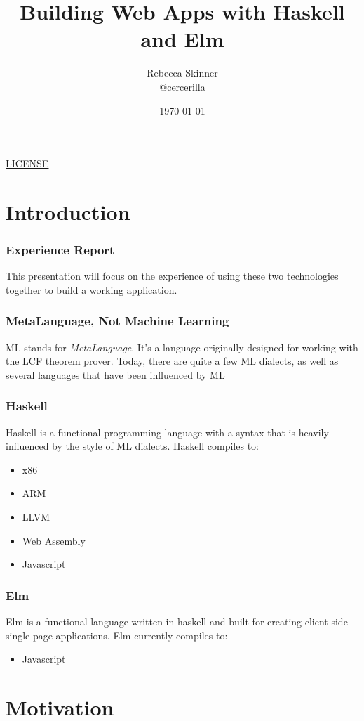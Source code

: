 \documentclass{beamer}
\title{Building Web Apps with Haskell and Elm}
\author{Rebecca Skinner\\ \small{@cercerilla}}
\date{\today}
\newcommand{\chref}[3] {
  {\color{#1} \href{#2}{\underline{#3}}}
}
\begin{document}
\begin{frame}
  \titlepage{}
  \begin{center}
    \small{\chref{blue}{http://creativecommons.org/licenses/by-sa/4.0/}{LICENSE}}
  \end{center}
\end{frame}

\section{Introduction}

\begin{frame}
  \frametitle{Experience Report}
  This presentation will focus on the experience of using these two
  technologies together to build a working application.
\end{frame}

\begin{frame}
  \frametitle{MetaLanguage, Not Machine Learning}
  ML stands for \emph{MetaLanguage}.  It's a language originally
  designed for working with the LCF theorem prover. Today, there are
  quite a few ML dialects, as well as several languages that have been
  influenced by ML
\end{frame}

\begin{frame}
  \frametitle{Haskell}
  Haskell is a functional programming language with a syntax that is
  heavily influenced by the style of ML dialects.  Haskell compiles to:
  \begin{itemize}
  \item x86
  \item ARM
  \item LLVM
  \item Web Assembly
  \item Javascript
  \end{itemize}
\end{frame}

\begin{frame}
  \frametitle{Elm}
  Elm is a functional language written in haskell and built for
  creating client-side single-page applications.  Elm currently
  compiles to:
  \begin{itemize}
  \item Javascript
  \end{itemize}
\end{frame}

\section{Motivation}
\end{document}
